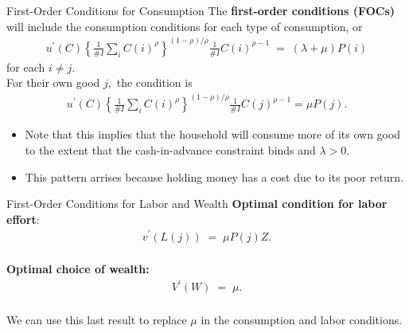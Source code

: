 \documentclass[10pt,c,aspectratio=1610,handout]{beamer}
\begin{document}
\begin{frame}{First-Order Conditions for Consumption}%
  The \textbf{first-order conditions (FOCs)} will include the consumption conditions for each type of consumption, or%
  \begin{align*}%
    u^{\prime }(C)\left\{ \frac{1}{\#I}\sum_{i}C(i)^{\rho }\right\} ^{(1-\rho)/\rho }\frac{1}{\#I}C(i)^{\rho -1} \; = \; \left( \lambda +\mu \right) P(i)%
  \end{align*}%
  for each $i\neq j$.\\%
  \medskip%
  \pause%
  For their own good $j,$ the condition is%
  \begin{align*}%
    u^{\prime }(C)\left\{ \frac{1}{\#I}\sum_{i}C(i)^{\rho }\right\} ^{(1-\rho)/\rho }\frac{1}{\#I}C(j)^{\rho -1}=\mu P(j).%
  \end{align*}%
  \pause%
  \begin{itemize}%
    \small%
    \item[$\blacktriangleright$] Note that this implies that the household will consume more of its own good to the extent that the cash-in-advance constraint binds and $\lambda >0. $%
    \item[$\blacktriangleright$] This pattern arrises because holding money has a cost due to its poor return.%
  \end{itemize}%
\end{frame}%
\begin{frame}{First-Order Conditions for Labor and Wealth}%
  \textbf{Optimal condition for labor effort}:%
  \begin{align}%
    v^{\prime }(L(j)) \; = \; \mu P(j)Z.  \label{pricing eq good j}%
  \end{align}\\%
  \vspace*{0.2in}%
  \pause%
  \textbf{Optimal choice of wealth:}%
  \begin{align}%
    V^{\prime }(W) \; = \; \mu .%
  \end{align}\\%
  \vspace*{0.2in}%
  \pause%
  We can use this last result to replace $\mu$ in the consumption and labor conditions.%
  \normalsize%
\end{frame}%
\end{document}
